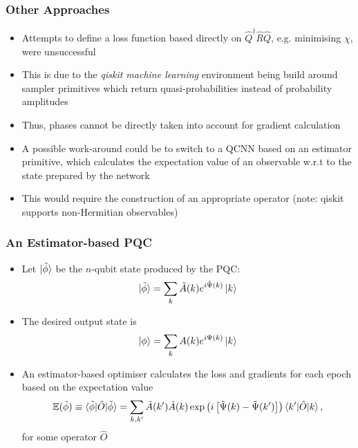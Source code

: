 \documentclass{beamer}
\begin{document}
\begin{frame}
\frametitle{Other Approaches}
\begin{itemize}
\item Attempts to define a loss function based directly on $\hat{Q}^\dagger \hat{R} \hat{Q}$, e.g. minimising $\chi$, were \alert{unsuccessful} 
\item This is due to the \emph{qiskit machine learning} environment being build around \alert{sampler primitives} which return quasi-probabilities instead of probability amplitudes 
\item Thus, phases cannot be directly taken into account for gradient calculation 
\item A possible work-around could be to switch to a QCNN based on an \alert{estimator primitive}, which calculates the expectation value of an observable w.r.t to the state prepared by the network 
\item This would require the construction of an \alert{appropriate operator} (note: qiskit supports non-Hermitian observables) 
\end{itemize}
\end{frame}

\begin{frame}
\frametitle{An Estimator-based PQC}
\begin{itemize}
\item Let $\ket{\tilde{\phi}}$ be the $n$-qubit state produced by the PQC:
\begin{equation}
\ket{\tilde{\phi}}= \sum_k \tilde{A}(k) e^{i \tilde{\Psi}(k)} \ket{k}
\end{equation}
\item The desired output state is 
\begin{equation}
\ket{\phi}= \sum_k A(k) e^{i \Psi(k)} \ket{k}
\end{equation}
\item An estimator-based optimiser calculates the loss and gradients for each epoch based on the expectation value 
\begin{equation} \mathbb{E}(\tilde{\phi}) \equiv \braket{\tilde{\phi}| \hat{O}| \tilde{\phi}} = \sum_{k, k'} \tilde{A}(k')\tilde{A}(k) \exp \left(i \left[ \tilde{\Psi}(k) - \tilde{\Psi}(k') \right] \right) \braket{k' | \hat{O}| k}, 
\end{equation}
for some operator $\hat{O}$
\end{itemize}
\end{frame}
\end{document}
